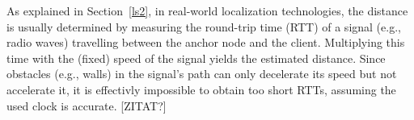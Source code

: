 As explained in Section~\ref{ls2}, in real-world localization technologies, the distance is usually determined by measuring the round-trip time (RTT) of a signal (e.g., radio waves) travelling between the anchor node and the client. Multiplying this time with the (fixed) speed of the signal yields the estimated distance. Since obstacles (e.g., walls) in the signal's path can only decelerate its speed but not accelerate it, it is effectivly impossible to obtain too short RTTs, assuming the used clock is accurate. [ZITAT?]